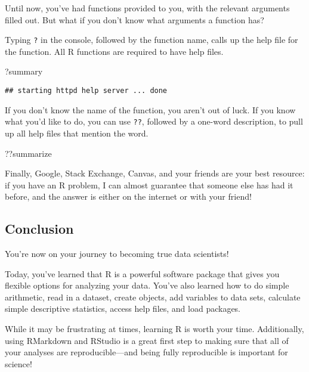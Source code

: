 \documentclass[
]{article}
\newenvironment{Shaded}{\begin{snugshade}}{\end{snugshade}}
\newcommand{\NormalTok}[1]{#1}
\begin{document}
Until now, you've had functions provided to you, with the relevant
arguments filled out. But what if you don't know what arguments a
function has?

Typing \texttt{?} in the console, followed by the function name, calls
up the help file for the function. All R functions are required to have
help files.

\begin{Shaded}
\begin{Highlighting}[]
\NormalTok{?summary}
\end{Highlighting}
\end{Shaded}

\begin{verbatim}
## starting httpd help server ... done
\end{verbatim}

If you don't know the name of the function, you aren't out of luck. If
you know what you'd like to do, you can use \texttt{??}, followed by a
one-word description, to pull up all help files that mention the word.

\begin{Shaded}
\begin{Highlighting}[]
\NormalTok{??summarize}
\end{Highlighting}
\end{Shaded}

Finally, Google, Stack Exchange, Canvas, and your friends are your best
resource: if you have an R problem, I can almost guarantee that someone
else has had it before, and the answer is either on the internet or with
your friend!

\hypertarget{conclusion}{%
\subsection{Conclusion}\label{conclusion}}

You're now on your journey to becoming true data scientists!

Today, you've learned that R is a powerful software package that gives
you flexible options for analyzing your data. You've also learned how to
do simple arithmetic, read in a dataset, create objects, add variables
to data sets, calculate simple descriptive statistics, access help
files, and load packages.

While it may be frustrating at times, learning R is worth your time.
Additionally, using RMarkdown and RStudio is a great first step to
making sure that all of your analyses are reproducible---and being fully
reproducible is important for science!
\end{document}
